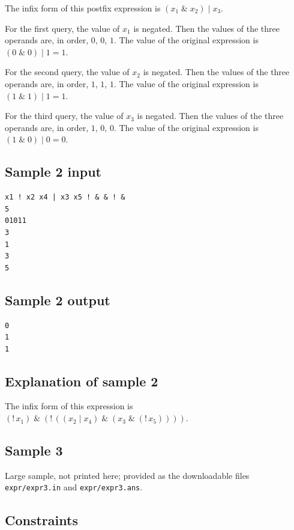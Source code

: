 \documentclass[11pt]{article}
\begin{document}
The infix form of this postfix expression is
$(x_1 \;\texttt{\&}\; x_2) \;\texttt{|}\; x_3$.

For the first query, the value of $x_1$ is negated.
Then the values of the three operands are, in order, $0$, $0$, $1$.
The value of the original expression is
$(0 \;\texttt{\&}\; 0) \;\texttt{|}\; 1 = 1$.

For the second query, the value of $x_2$ is negated.
Then the values of the three operands are, in order, $1$, $1$, $1$.
The value of the original expression is
$(1 \;\texttt{\&}\; 1) \;\texttt{|}\; 1 = 1$.

For the third query, the value of $x_3$ is negated.
Then the values of the three operands are, in order, $1$, $0$, $0$.
The value of the original expression is
$(1 \;\texttt{\&}\; 0) \;\texttt{|}\; 0 = 0$.

\subsection*{Sample 2 input}

\begin{verbatim}
x1 ! x2 x4 | x3 x5 ! & & ! &
5
01011
3
1
3
5
\end{verbatim}

\subsection*{Sample 2 output}

\begin{verbatim}
0
1
1
\end{verbatim}

\subsection*{Explanation of sample 2}

The infix form of this expression is
$(\texttt{!}\, x_1) \;\texttt{\&}\;
 (\texttt{!}\, ((x_2 \;\texttt{|}\; x_4) \;\texttt{\&}\;
 (x_3 \;\texttt{\&}\; (\texttt{!}\, x_5))))$.

\subsection*{Sample 3}

Large sample, not printed here;
provided as the downloadable files \texttt{expr/expr3.in} and \texttt{expr/expr3.ans}.

\subsection*{Constraints}
\end{document}
